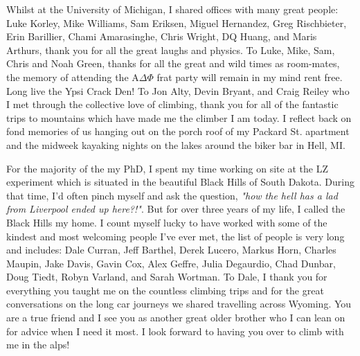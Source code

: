 \documentclass[a4paper,11pt,usegeometry]{scrreprt} %
\begin{document}
Whilst at the University of Michigan, I shared offices with many great people: Luke Korley, Mike Williams, Sam Eriksen, Miguel Hernandez, Greg Rischbieter, Erin Barillier, Chami Amarasinghe, Chris Wright, DQ Huang, and Maris Arthurs, thank you for all the great laughs and physics. To Luke, Mike, Sam, Chris and Noah Green, thanks for all the great and wild times as room-mates, the memory of attending the A$\Delta\Phi$ frat party will remain in my mind rent free. Long live the Ypsi Crack Den! To Jon Alty, Devin Bryant, and Craig Reiley who I met through the collective love of climbing, thank you for all of the fantastic trips to mountains which have made me the climber I am today. I reflect back on fond memories of us hanging out on the porch roof of my Packard St. apartment and the midweek kayaking nights on the lakes around the biker bar in Hell, MI. 

For the majority of the my PhD, I spent my time working on site at the LZ experiment which is situated in the beautiful Black Hills of South Dakota. During that time, I'd often pinch myself and ask the question, \textit{"how the hell has a lad from Liverpool ended up here?!"}. But for over three years of my life, I called the Black Hills my home. I count myself lucky to have worked with some of the kindest and most welcoming people I've ever met, the list of people is very long and includes: Dale Curran, Jeff Barthel, Derek Lucero, Markus Horn, Charles Maupin, Jake Davis, Gavin Cox, Alex Geffre, Julia Degaurdio, Chad Dunbar, Doug Tiedt, Robyn Varland, and Sarah Wortman. To Dale, I thank you for everything you taught me on the countless climbing trips and for the great conversations on the long car journeys we shared travelling across Wyoming. You are a true friend and I see you as another great older brother who I can lean on for advice when I need it most. I look forward to having you over to climb with me in the alps!
\end{document}
